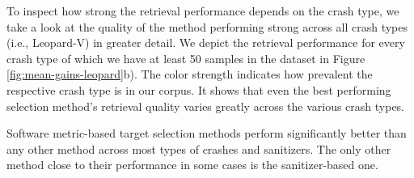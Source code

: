 To inspect how strong the retrieval performance depends on the crash type, we take a look at the quality of the method performing strong across all crash types (i.e., Leopard-V) in greater detail. We depict the retrieval performance for every crash type of which we have at least 50 samples in the dataset in Figure \ref{fig:mean-gains-leopard}b). The color strength indicates how prevalent the respective crash type is in our corpus. It shows that even the best performing selection method's retrieval quality varies greatly across the various crash types. 

\cstart
\begin{tcolorbox}[boxrule=1pt, arc=1mm, colback=white, colframe=coldefault]
	Software metric-based target selection methods perform significantly better than any other method across most types of crashes and sanitizers. The only other method close to their performance in some cases is the sanitizer-based one.
\end{tcolorbox}
\cend